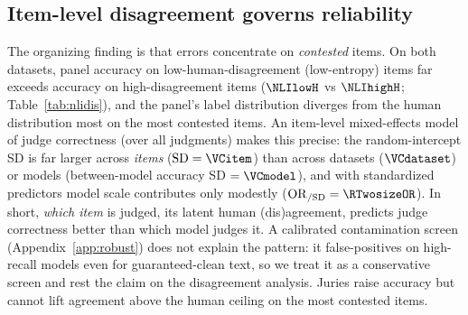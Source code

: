 \begin{table}[t]\centering\small
\caption{Study 3 (NLI). Open panel vs the human-human ceiling. Ceiling = random-annotator-vs-majority accuracy;
macro-F1 is the best model's chance-corrected score.}
\label{tab:nlires}

\end{table}

\subsection{Item-level disagreement governs reliability}
The organizing finding is that errors concentrate on \emph{contested} items. On both datasets, panel accuracy on
low-human-disagreement (low-entropy) items far exceeds accuracy on high-disagreement items ($\NLIlowH$ vs
$\NLIhighH$; Table~\ref{tab:nlidis}), and the panel's label distribution diverges from the human distribution most on
the most contested items. An item-level mixed-effects model of judge correctness (over all \NLInjudg{} judgments)
makes this precise: the random-intercept SD is far larger across \emph{items} ($\mathrm{SD}=\VCitem$) than across
datasets ($\VCdataset$) or models (between-model accuracy SD $=\VCmodel$), and with standardized predictors model
scale contributes only modestly ($\mathrm{OR}_{/\mathrm{SD}}=\RTwosizeOR$). In short, \emph{which item} is judged,
its latent human (dis)agreement, predicts judge correctness better than which model judges it. A calibrated
contamination screen (Appendix~\ref{app:robust}) does not explain the pattern: it false-positives on high-recall
models even for guaranteed-clean text, so we treat it as a conservative screen and rest the claim on the
disagreement analysis. Juries raise accuracy but cannot lift agreement above the human ceiling on the most contested
items.

\begin{table}[t]\centering\small
\caption{Study 3 (NLI) disagreement-aware results. Ceiling with annotator-bootstrap 95\% CI; best-model $\kappa$ and
macro-F1; panel accuracy on low- vs high-human-disagreement items; Jensen-Shannon panel-vs-human divergence.}
\label{tab:nlidis}

\end{table}

